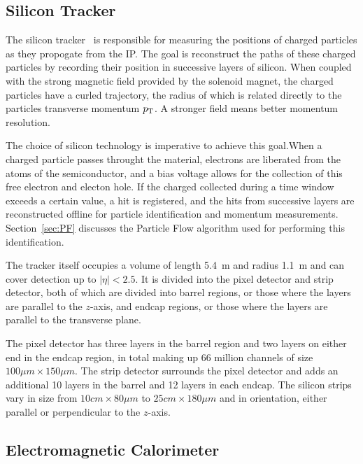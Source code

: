 \subsection{Silicon Tracker\label{subsec:tracker}}

The silicon tracker~\cite{Karimaki:368412} is responsible for measuring the positions of charged particles as they propogate from the IP.
The goal is reconstruct the paths of these charged particles by recording their position
in successive layers of silicon. When coupled with the strong magnetic field provided by the solenoid
magnet, the charged particles have a curled trajectory, the radius of which is related directly
to the particles transverse momentum $p_{\rm T}$. A stronger field means better momentum resolution.

The choice of silicon technology is imperative to achieve this goal.When a charged particle passes throught the material, electrons are liberated from the atoms of the semiconductor, and a bias voltage
allows for the collection of this free electron and electon hole. If the charged collected during
a time window exceeds a certain value, a hit is registered, and the hits from successive layers
are reconstructed offline for particle identification and momentum measurements.
Section~\ref{sec:PF} discusses the Particle Flow algorithm used for performing this identification.

The tracker itself occupies a volume
of length 5.4~m and radius 1.1~m and can cover detection up to $|\eta| < 2.5$. It is divided into
the pixel detector and strip detector, both of which are divided into barrel regions, or those
where the layers are parallel to the $z$-axis, and endcap regions, or those where the layers
are parallel to the transverse plane.

The pixel detector has three layers in the barrel region
and two layers on either end in the endcap region, in total making up 66 million channels of size
$100 \mu m \times 150 \mu m$. The strip detector surrounds the pixel detector and adds an additional
10 layers in the barrel and 12 layers in each endcap. The silicon strips vary in size from
$10 cm \times 80 \mu m$ to $25 cm \times 180 \mu m$ and in orientation, either parallel or perpendicular
to the $z$-axis.

\subsection{Electromagnetic Calorimeter\label{subsec:ecal}}

